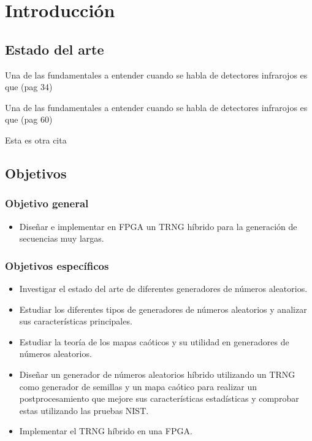 \chapter{Introducción}

	\section{Estado del arte}
	
	Una de las fundamentales a entender cuando se habla de detectores infrarojos es que \cite{Rogalski2020} (pag 34)
	
	Una de las fundamentales a entender cuando se habla de detectores infrarojos es que \cite{Rogalski2020} (pag 60)
	
	Esta es otra cita \cite{He2000}	
	
	
    \lipsum[1-3]


    \section{Objetivos}
	
		\subsection{Objetivo general}
			\begin{itemize}
				\item Diseñar e implementar en FPGA un TRNG híbrido para la generación de secuencias muy largas.
			\end{itemize}
		
		\subsection{Objetivos específicos}
			\begin{itemize}
                \item Investigar el estado del arte de diferentes generadores de números aleatorios.
                \item Estudiar los diferentes tipos de generadores de números aleatorios y analizar sus características principales.
                \item Estudiar la teoría de los mapas caóticos y su utilidad en generadores de números aleatorios.
                \item Diseñar un generador de números aleatorios híbrido utilizando un TRNG como generador de semillas y un mapa caótico para realizar un postprocesamiento que mejore sus características estadísticas y comprobar estas utilizando las pruebas NIST.
                \item Implementar el TRNG híbrido en una FPGA.
			\end{itemize}
